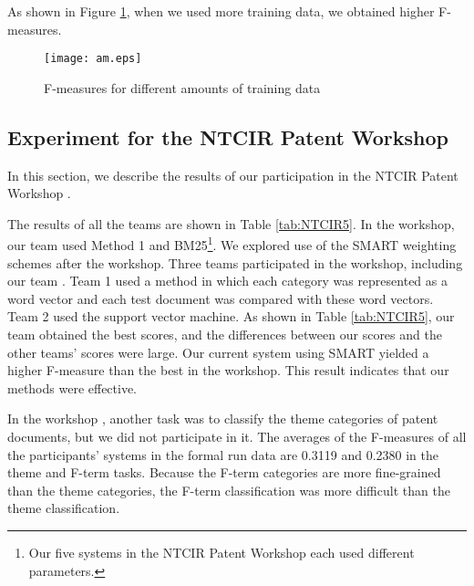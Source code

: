 \documentclass[english]{jnlp_1.2c}
\begin{document}
As shown in Figure \ref{fig:amount}, 
when we used more training data,
we obtained higher F-measures. 
\begin{figure}[t]
      \begin{center}
        \texttt{[image: am.eps]} 
      \end{center}
    \caption{F-measures for different amounts of training data}
    \label{fig:amount}
\end{figure}


\subsection{Experiment for the NTCIR Patent Workshop}

In this section, we describe the results of our 
participation in the NTCIR Patent Workshop \cite{Ntcir5_patent_2}. 

The results of all the teams are shown in Table \ref{tab:NTCIR5}.
In the workshop, 
our team used Method 1 and BM25\footnote{Our five 
systems in the NTCIR Patent Workshop each used 
different parameters.}.  
We explored use of the SMART weighting schemes after the workshop.
Three teams participated in the workshop,
including our team \cite{Ntcir5_patent_2}.
Team 1 used a method in which
each category was represented as a word vector 
and each test document was compared with these word vectors.
Team 2 used the support vector machine. 
As shown in Table \ref{tab:NTCIR5},
our team obtained the best scores, and
the differences between our scores 
and the other teams' scores were large.
Our current system using SMART 
yielded a higher F-measure than the best in the workshop. 
This result indicates that 
our methods were effective.

In the workshop \cite{Ntcir5_patent_2}, 
another task was to classify the theme categories of patent documents, 
but we did not participate in it.
The averages of the F-measures of all the participants' systems 
in the formal run data 
are 0.3119 and 0.2380 in the theme and F-term tasks.
Because the F-term categories are 
more fine-grained than the theme categories, 
the F-term classification was more difficult than
the theme classification. 
\end{document}
